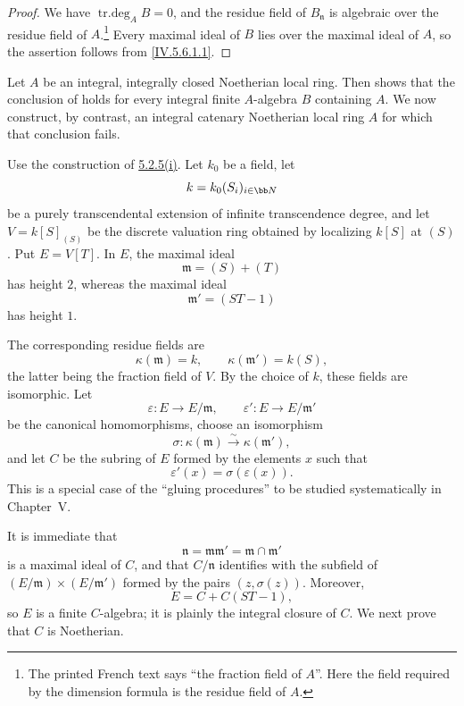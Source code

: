 \begin{proof}
We have $\operatorname{tr.deg}_A B=0$, and the residue field of
$B_{\mathfrak n}$ is algebraic over the residue field of
$A$.\footnote{The printed French text says ``the fraction field of
$A$''.  Here the field required by the dimension formula is the
residue field of $A$.}  Every maximal ideal of $B$ lies over the
maximal ideal of $A$, so the assertion follows from
\eqref{IV.5.6.1.1}.
\end{proof}

\begin{example}[5.6.11]
\label{IV.5.6.11}
Let $A$ be an integral, integrally closed Noetherian local ring.
Then  shows that the conclusion of
 holds for every integral finite $A$-algebra $B$
containing $A$.  We now construct, by contrast, an integral
catenary Noetherian local ring $A$ for which that conclusion fails.

Use the construction of \hyperref[IV.5.2.5.i]{5.2.5\textup{(i)}}.
Let $k_0$ be a field,
let
\[
k=k_0(S_i)_{i\in\bb N}
\]
be a purely transcendental extension of infinite transcendence
degree, and let $V=k[S]_{(S)}$ be the discrete valuation ring
obtained by localizing $k[S]$ at $(S)$.  Put $E=V[T]$.  In $E$, the
maximal ideal
\[
\mathfrak m=(S)+(T)
\]
has height $2$, whereas the maximal ideal
\[
\mathfrak m'=(ST-1)
\]
has height $1$.


The corresponding residue fields are
\[
\kappa(\mathfrak m)=k,
\qquad
\kappa(\mathfrak m')=k(S),
\]
the latter being the fraction field of $V$.  By the choice of $k$,
these fields are isomorphic.  Let
\[
\varepsilon:E\longrightarrow E/\mathfrak m,
\qquad
\varepsilon':E\longrightarrow E/\mathfrak m'
\]
be the canonical homomorphisms, choose an isomorphism
\[
\sigma:\kappa(\mathfrak m)\xrightarrow{\sim}\kappa(\mathfrak m'),
\]
and let $C$ be the subring of $E$ formed by the elements $x$ such
that
\[
\varepsilon'(x)=\sigma(\varepsilon(x)).
\]
This is a special case of the ``gluing procedures'' to be studied
systematically in Chapter~V.

It is immediate that
\[
\mathfrak n=\mathfrak m\mathfrak m'
 =\mathfrak m\cap\mathfrak m'
\]
is a maximal ideal of $C$, and that $C/\mathfrak n$ identifies with
the subfield of
$(E/\mathfrak m)\times(E/\mathfrak m')$ formed by the pairs
$(z,\sigma(z))$.  Moreover,
\[
E=C+C(ST-1),
\]
so $E$ is a finite $C$-algebra; it is plainly the integral closure
of $C$.  We next prove that $C$ is Noetherian.


\end{example}
